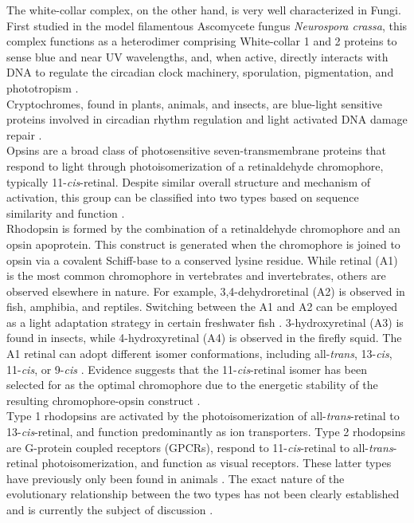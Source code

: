 \indent The white-collar complex, on the other hand, is very well characterized in Fungi. First studied in the model filamentous Ascomycete fungus \textit{Neurospora crassa}, this complex functions as a heterodimer comprising White-collar 1 and 2 proteins to sense blue and near UV wavelengths, and, when active, directly interacts with DNA to regulate the circadian clock machinery, sporulation, pigmentation, and phototropism \cite{Ballario1997,Purschwitz2006,Corrochano2007}. \\
\indent Cryptochromes, found in plants, animals, and insects, are blue-light sensitive proteins involved in circadian rhythm regulation and light activated DNA damage repair \cite{Idnurm2010}.\\
\indent Opsins are a broad class of photosensitive seven-transmembrane proteins that respond to light through photoisomerization of a retinaldehyde chromophore, typically 11-\textit{cis}-retinal. Despite similar overall structure and mechanism of activation, this group can be classified into two types based on sequence similarity and function \cite{Spudich2000}.\\
\indent Rhodopsin is formed by the combination of a retinaldehyde chromophore and an opsin apoprotein. This construct is generated when the chromophore is joined to opsin via a covalent Schiff-base to a conserved lysine residue. While retinal (A1) is the most common chromophore in vertebrates and invertebrates, others are observed elsewhere in nature. For example, 3,4-dehydroretinal (A2) is observed in fish, amphibia, and reptiles. Switching between the A1 and A2 can be employed as a light adaptation strategy in certain freshwater fish \cite{Shichida2009}. 3-hydroxyretinal (A3) is found in insects, while 4-hydroxyretinal (A4) is observed in the firefly squid. The A1 retinal can adopt different isomer conformations, including all-\textit{trans}, 13-\textit{cis}, 11-\textit{cis}, or 9-\textit{cis} \cite{Shichida2009}. Evidence suggests that the 11-\textit{cis}-retinal isomer has been selected for as the optimal chromophore due to the energetic stability of the resulting chromophore-opsin construct \cite{Sekharan2011}.\\ 
\indent Type 1 rhodopsins are activated by the photoisomerization of all-\textit{trans}-retinal to 13-\textit{cis}-retinal, and function predominantly as ion transporters. Type 2 rhodopsins are G-protein coupled receptors (GPCRs), respond to 11-\textit{cis}-retinal to all-\textit{trans}-retinal photoisomerization, and function as visual receptors. These latter types have previously only been found in animals \cite{Spudich2000}. The exact nature of the evolutionary relationship between the two types has not been clearly established and is currently the subject of discussion \cite{Terakita2005,Shichida2009}.\\
